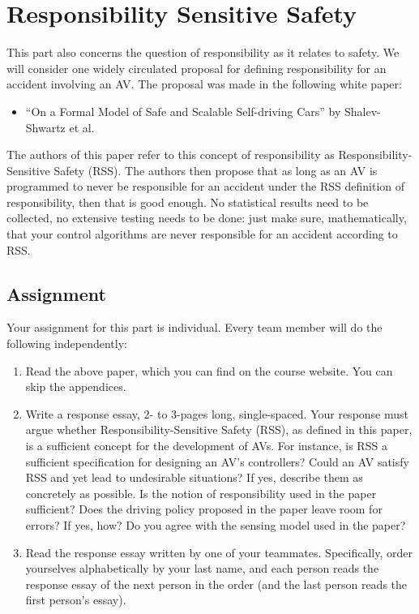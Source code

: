 \documentclass[letta4 paper]{article}
\numberwithin{equation}{section}
\newcommand{\0}{\mathbf{0}}
\begin{document}
	\section{Responsibility Sensitive Safety}
	\label{sec:rss}
	This part also concerns the question of responsibility as it relates to safety. 
	We will consider one widely circulated proposal for defining responsibility for an accident involving an AV.
	The proposal was made in the following white paper:
	\begin{itemize}
		\item ``On a Formal Model of Safe and Scalable Self-driving Cars'' by Shalev-Shwartz et al.
	\end{itemize}
	The authors of this paper refer to this concept of responsibility as Responsibility-Sensitive Safety (RSS).
	The authors then propose that as long as an AV is programmed to never be responsible for an accident under the RSS definition of responsibility, then that is good enough. 
	No statistical results need to be collected, no extensive testing needs to be done: just make sure, mathematically, that your control algorithms are never responsible for an accident according to RSS. 
	
	\subsection{Assignment}
	Your assignment for this part is individual. 
	Every team member will do the following independently: 
	\begin{enumerate}
		\item Read the above paper, which you can find on the course website. You can skip the appendices.
		\item Write a response essay, 2- to 3-pages long, single-spaced. 
		Your response must argue whether Responsibility-Sensitive Safety (RSS), as defined in this paper, is a sufficient concept for the development of AVs.
		For instance, is RSS a sufficient specification for designing an AV's controllers? 
		Could an AV satisfy RSS and yet lead to undesirable situations? If yes, describe them as concretely as possible.
		Is the notion of responsibility used in the paper sufficient? 
		Does the driving policy proposed in the paper leave room for errors? If yes, how?
		Do you agree with the sensing model used in the paper? 
		\item Read the response essay written by one of your teammates. Specifically, order yourselves alphabetically by your last name, and each person reads the response essay of the next person in the order (and the last person reads the first person's essay).
	\end{enumerate}
	
\end{document}
